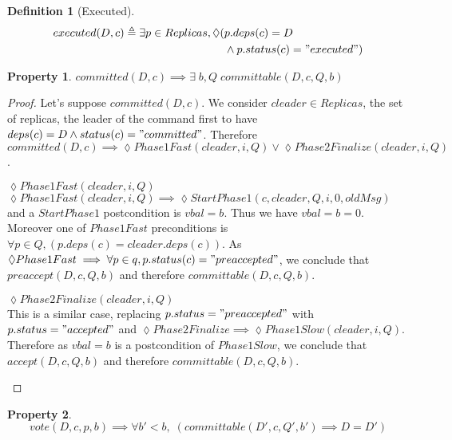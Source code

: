 \documentclass[a4paper]{article}
\theoremstyle{definition}
\newtheorem{definition}{Definition}
\theoremstyle{plain}
\newtheorem{property}{Property}
\begin{document}
\begin{definition}[Executed]
\begin{align*}
    executed(D,c) \triangleq  \exists p \in Replicas, \lozenge(& p.deps(c) = D \\
                                                                &\wedge p.status(c) = "executed") 
\end{align*}

\end{definition}





\begin{property}
$committed(D,c) \implies \exists \; b,Q  \; committable(D,c,Q,b)$
\end{property}

\begin{proof}
Let's suppose $committed(D,c)$. We consider $cleader \in Replicas$, the set of replicas, the leader of the command first to have $deps(c) = D \wedge status(c) = "committed"$. Therefore $committed(D,c) \implies \lozenge Phase1Fast(cleader,i,Q) \vee \lozenge Phase2Finalize(cleader,i,Q)$.

\begin{case}
    \item $\lozenge Phase1Fast(cleader,i,Q)$\\
    $\lozenge Phase1Fast(cleader,i,Q) \implies \lozenge StartPhase1(c,cleader,Q,i,0,oldMsg)$ and a $StartPhase1$ postcondition is $vbal=b$. Thus we have $vbal=b=0$. Moreover one of $Phase1Fast$ preconditions is $\forall p \in Q, (p.deps(c) = cleader.deps(c))$. As $\lozenge Phase1Fast \implies \forall p \in q, p.status(c) = "preaccepted"$, we conclude that $preaccept(D,c,Q,b)$ and therefore $committable(D,c,Q,b)$.
    
    \item $\lozenge Phase2Finalize(cleader,i,Q)$\\
    This is a similar case, replacing $p.status="preaccepted"$ with $p.status="accepted"$ and $\lozenge Phase2Finalize \implies \lozenge Phase1Slow(cleader,i,Q)$. Therefore as $vbal=b$ is a postcondition of $Phase1Slow$, we conclude that $accept(D,c,Q,b)$ and therefore $committable(D,c,Q,b)$.
\end{case}
\end{proof}

\begin{property}
\begin{equation*}
    vote(D,c,p,b) \implies \forall b'<b, \; (committable(D',c,Q',b') \implies D=D')
\end{equation*}
\end{property}
\end{document}
